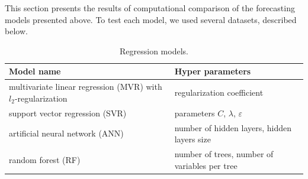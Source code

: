 \documentclass[conference]{IEEEtran}
\begin{document}
This section presents the results of computational comparison of the forecasting models presented above. To test each model, we used several datasets, described below.
\begin{table}\caption{Regression models.}\label{tb:regr_mdl}
\begin{tabular}{|p{4cm}|p{4cm}|}
\hline
Model name & Hyper parameters \\
\hline
 multivariate linear regression (MVR) with $l_2$-regularization & regularization coefficient \\
 \hline
support vector regression (SVR) & parameters $C$, $\lambda$, $\varepsilon$ \\
\hline
artificial neural network (ANN) &  number of hidden layers, hidden layers size \\
\hline random forest (RF) & number of trees, number of variables per tree\\
\hline
\end{tabular}
\end{table}
\end{document}
